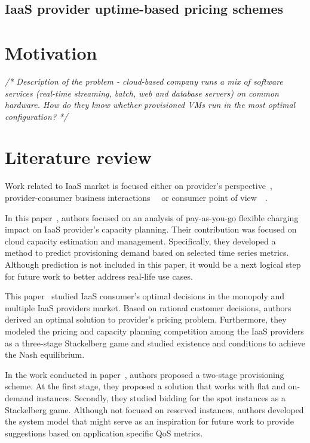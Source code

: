 \documentclass[]{final_report}
\begin{document}
\subsection{IaaS provider uptime-based pricing schemes}

\section{Motivation}
\emph{ /* Description of the problem - cloud-based company runs a mix of software services (real-time streaming, batch, web and database servers) on common hardware. How do they know whether provisioned VMs run in the most optimal configuration? */ }

\section{Literature review}

Work related to IaaS market is focused either on provider's perspective~\cite{6274129}, provider-consumer business interactions~\cite{6676685}~\cite{6963393} or consumer point of view~\cite{5961733}~\cite{6295066}. 


In this paper~\cite{6274129}, authors focused on an analysis of pay-as-you-go flexible charging impact on IaaS provider's capacity planning. Their contribution was focused on cloud capacity estimation and management. Specifically, they developed a method to predict provisioning demand based on selected time series metrics. 
Although prediction is not included in this paper, it would be a next logical step for future work to better address real-life use cases. 

This paper~\cite{6963393} studied IaaS consumer's optimal decisions in the monopoly and multiple IaaS providers market. Based on rational customer decisions, authors derived an optimal solution to provider's pricing problem. Furthermore, they modeled the pricing and capacity planning competition among the IaaS providers as a three-stage Stackelberg game and studied existence and conditions to achieve the Nash equilibrium. 

In the work conducted in paper~\cite{6676685}, authors proposed a two-stage provisioning scheme. At the first stage, they proposed a solution that works with flat and on-demand instances. Secondly, they studied bidding for the spot instances as a Stackelberg game. Although not focused on reserved instances, authors developed the system model that might serve as an inspiration for future work to provide suggestions based on application specific QoS metrics. 
\end{document}
